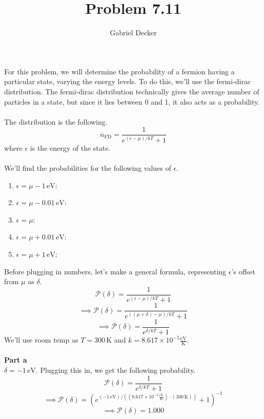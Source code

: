 \documentclass[12pt]{article}
\title{Problem 7.11}
\author{Gabriel Decker}
\newcommand{\boltzmannConstInEV}{8.617\times10^{-5}\frac{\text{eV}}{\text{K}}}
\begin{document}
\maketitle
\begin{flushleft}


For this problem, we will determine the probability of a fermion having a particular state, varying the energy levels.
To do this, we'll use the fermi-dirac distribution.
The fermi-dirac distribution technically gives the average number of particles in a state, but since it lies between 0 and 1, it also acts as a probability.\\~\\

The distribution is the following.
\begin{equation}
    \overline{n}_\text{FD}=\frac{1}{e^{(\epsilon-\mu)/kT}+1}
\end{equation}
where $\epsilon$ is the energy of the state.\\~\\

We'll find the probabilities for the following values of $\epsilon$.
\begin{enumerate}
    \item[a.] $\epsilon=\mu-1\,\text{eV}$:\\
    \item[b.] $\epsilon=\mu-0.01\,\text{eV}$:\\
    \item[c.] $\epsilon=\mu$:\\
    \item[d.] $\epsilon=\mu+0.01\,\text{eV}$:\\
    \item[e.] $\epsilon=\mu+1\,\text{eV}$:\\
\end{enumerate}

Before plugging in numbers, let's make a general formula, representing $\epsilon$'s offset from $\mu$ as $\delta$.
$$\mathcal{P}(\delta)=\frac{1}{e^{(\epsilon-\mu)/kT}+1}$$
$$\implies\mathcal{P}(\delta)=\frac{1}{e^{((\mu+\delta)-\mu)/kT}+1}$$
$$\implies\mathcal{P}(\delta)=\frac{1}{e^{\delta/kT}+1}$$
We'll use room temp as $T=300\,\text{K}$ and $k=\boltzmannConstInEV$.\\~\\

\textbf{Part a}\\
$\delta=-1\,\text{eV}$. Plugging this in, we get the following probability.
$$\mathcal{P}(\delta)=\frac{1}{e^{\delta/kT}+1}$$
$$\implies\mathcal{P}(\delta)=\left(e^{(-1\,\text{eV})/((\boltzmannConstInEV)\cdot(300\,\text{K}))}+1\right)^{-1}$$
$$\implies\mathcal{P}(\delta)=1.000$$\\~\\


\end{flushleft}
\end{document}
